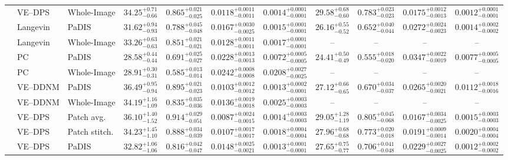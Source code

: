 \begin{landscape}
\begin{table}[p]
{\begin{tabular}{lllcccccccc}
 & VE--DPS & Whole-Image & $34.25^{+0.71}_{-0.66}$ & $0.865^{+0.021}_{-0.025}$ & $0.0118^{+0.0011}_{-0.0011}$ & $0.0014^{+0.0001}_{-0.0001}$ & $\mathbf{29.58^{+0.68}_{-0.60}}$ & $0.783^{+0.023}_{-0.023}$ & $0.0175^{+0.0012}_{-0.0013}$ & $\mathbf{0.0012^{+0.0001}_{-0.0001}}$ \\
 & Langevin & PaDIS & $31.62^{+0.94}_{-0.93}$ & $0.788^{+0.045}_{-0.048}$ & $0.0167^{+0.0030}_{-0.0025}$ & $0.0015^{+0.0001}_{-0.0001}$ & $26.16^{+0.55}_{-0.52}$ & $0.652^{+0.040}_{-0.044}$ & $0.0272^{+0.0024}_{-0.0023}$ & $0.0014^{+0.0002}_{-0.0002}$ \\
 & Langevin & Whole-Image & $33.26^{+0.63}_{-0.63}$ & $0.851^{+0.021}_{-0.021}$ & $0.0128^{+0.0011}_{-0.0011}$ & $0.0017^{+0.0001}_{-0.0001}$ & -- & -- & -- & -- \\
 & PC & PaDIS & $28.58^{+0.44}_{-0.44}$ & $0.691^{+0.025}_{-0.027}$ & $0.0228^{+0.0013}_{-0.0013}$ & $0.0072^{+0.0005}_{-0.0005}$ & $24.41^{+0.50}_{-0.49}$ & $0.555^{+0.018}_{-0.020}$ & $0.0347^{+0.0022}_{-0.0019}$ & $0.0077^{+0.0005}_{-0.0005}$ \\
 & PC & Whole-Image & $28.91^{+0.30}_{-0.31}$ & $0.585^{+0.013}_{-0.014}$ & $0.0242^{+0.0008}_{-0.0008}$ & $0.0208^{+0.0027}_{-0.0025}$ & -- & -- & -- & -- \\
 & VE--DDNM & PaDIS & $\mathbf{36.49^{+0.95}_{-0.94}}$ & $0.895^{+0.021}_{-0.023}$ & $0.0103^{+0.0012}_{-0.0012}$ & $\mathbf{0.0013^{+0.0002}_{-0.0001}}$ & $27.12^{+0.66}_{-0.65}$ & $0.670^{+0.034}_{-0.037}$ & $0.0265^{+0.0020}_{-0.0021}$ & $0.0112^{+0.0018}_{-0.0016}$ \\
 & VE--DDNM & Whole-Image & $34.19^{+1.16}_{-1.09}$ & $0.835^{+0.035}_{-0.036}$ & $0.0136^{+0.0019}_{-0.0018}$ & $0.0025^{+0.0003}_{-0.0003}$ & -- & -- & -- & -- \\
 & VE--DPS & Patch avg. & $36.10^{+1.40}_{-1.52}$ & $\mathbf{0.914^{+0.029}_{-0.051}}$ & $\mathbf{0.0087^{+0.0024}_{-0.0015}}$ & $0.0014^{+0.0003}_{-0.0003}$ & $29.05^{+1.28}_{-1.19}$ & $\mathbf{0.805^{+0.045}_{-0.068}}$ & $\mathbf{0.0167^{+0.0034}_{-0.0025}}$ & $0.0015^{+0.0003}_{-0.0003}$ \\
 & VE--DPS & Patch stitch. & $34.23^{+1.45}_{-1.10}$ & $0.888^{+0.034}_{-0.039}$ & $0.0107^{+0.0017}_{-0.0017}$ & $0.0018^{+0.0004}_{-0.0004}$ & $27.96^{+0.68}_{-0.68}$ & $0.773^{+0.020}_{-0.018}$ & $0.0191^{+0.0009}_{-0.0014}$ & $0.0020^{+0.0004}_{-0.0004}$ \\
 & VE--DPS & PaDIS & $32.82^{+1.06}_{-1.06}$ & $0.816^{+0.042}_{-0.047}$ & $0.0148^{+0.0025}_{-0.0021}$ & $\mathbf{0.0013^{+0.0001}_{-0.0001}}$ & $27.65^{+0.75}_{-0.77}$ & $0.706^{+0.041}_{-0.048}$ & $0.0229^{+0.0027}_{-0.0025}$ & $\mathbf{0.0012^{+0.0002}_{-0.0002}}$ \\
\bottomrule[1.1pt]
\end{tabular}
}
\end{table}
\end{landscape}
\clearpage

